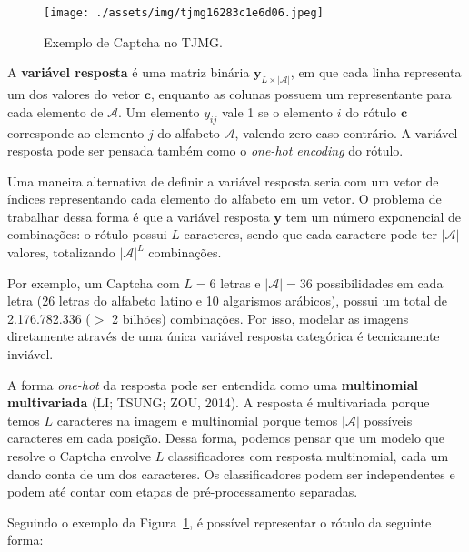\documentclass[12pt,twoside,brazilian]{book}
\begin{document}
\begin{figure}

{\centering \texttt{[image: ./assets/img/tjmg16283c1e6d06.jpeg]}

}

\caption{\label{fig-exemplo-tjmg}Exemplo de Captcha no TJMG.}

\end{figure}

A \textbf{variável resposta} é uma matriz binária
\(\mathbf y_{L \times |\mathcal A|}\), em que cada linha representa um
dos valores do vetor \(\mathbf c\), enquanto as colunas possuem um
representante para cada elemento de \(\mathcal A\). Um elemento
\(y_{ij}\) vale 1 se o elemento \(i\) do rótulo \(\mathbf c\)
corresponde ao elemento \(j\) do alfabeto \(\mathcal A\), valendo zero
caso contrário. A variável resposta pode ser pensada também como o
\emph{one-hot encoding} do rótulo.

Uma maneira alternativa de definir a variável resposta seria com um
vetor de índices representando cada elemento do alfabeto em um vetor. O
problema de trabalhar dessa forma é que a variável resposta
\(\mathbf y\) tem um número exponencial de combinações: o rótulo possui
\(L\) caracteres, sendo que cada caractere pode ter \(|\mathcal A|\)
valores, totalizando \(|\mathcal A|^L\) combinações.

Por exemplo, um Captcha com \(L=6\) letras e \(|\mathcal A| = 36\)
possibilidades em cada letra (26 letras do alfabeto latino e 10
algarismos arábicos), possui um total de 2.176.782.336 (\(>\) 2 bilhões)
combinações. Por isso, modelar as imagens diretamente através de uma
única variável resposta categórica é tecnicamente inviável.

A forma \emph{one-hot} da resposta pode ser entendida como uma
\textbf{multinomial} \textbf{multivariada} (LI; TSUNG; ZOU, 2014). A
resposta é multivariada porque temos \(L\) caracteres na imagem e
multinomial porque temos \(|\mathcal A|\) possíveis caracteres em cada
posição. Dessa forma, podemos pensar que um modelo que resolve o Captcha
envolve \(L\) classificadores com resposta multinomial, cada um dando
conta de um dos caracteres. Os classificadores podem ser independentes e
podem até contar com etapas de pré-processamento separadas.

Seguindo o exemplo da Figura~\ref{fig-exemplo-tjmg}, é possível
representar o rótulo da seguinte forma:
\end{document}
